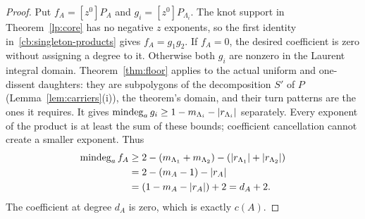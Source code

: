 \begin{proof}
Put $f_A=[z^0]P_A$ and $g_i=[z^0]P_{\Lambda_i}$. The knot support in
Theorem~\ref{lp:core} has no negative $z$ exponents, so the first
identity in~\eqref{cb:singleton-products} gives $f_A=g_1g_2$.
If $f_A=0$, the desired coefficient is zero without assigning a degree
to it. Otherwise both $g_i$ are nonzero in the Laurent integral domain.
Theorem~\ref{thm:floor} applies to the actual uniform and one-dissent
daughters: they are subpolygons of the decomposition $S'$ of $P$
(Lemma~\ref{lem:carriers}(i)), the theorem's domain, and their turn
patterns are the ones it requires. It gives
$\operatorname{mindeg}_a g_i\geq 1-m_{\Lambda_i}-|r_{\Lambda_i}|$ separately.
Every exponent of the product is at least the sum of these bounds;
coefficient cancellation cannot create a smaller exponent. Thus
\begin{align}
 \operatorname{mindeg}_a f_A
 &\geq 2-(m_{\Lambda_1}+m_{\Lambda_2})
                -(|r_{\Lambda_1}|+|r_{\Lambda_2}|)\notag\\
 &=2-(m_A-1)-|r_A|\notag\\
 &=(1-m_A-|r_A|)+2=d_A+2.
 \label{cb:singleton-gap}
\end{align}
The coefficient at degree $d_A$ is zero, which is exactly $c(A)$.
\end{proof}


